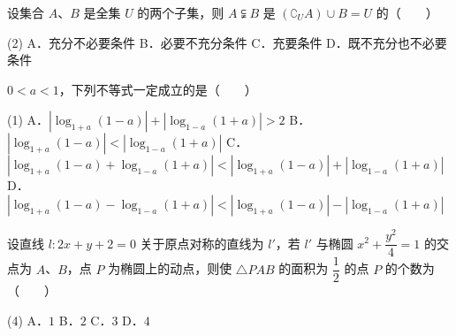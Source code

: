 \begin{question}
设集合 $A$、$B$ 是全集 $U$ 的两个子集，则 $A \subsetneqq B$ 是 $(\complement_U A) \cup B = U$ 的\mbox{（　　）}

\begin{gkopts}(2)
\task A．充分不必要条件
\task B．必要不充分条件
\task C．充要条件
\task D．既不充分也不必要条件
\end{gkopts}

\end{question}
\begin{question}
$0 < a < 1$，下列不等式一定成立的是\mbox{（　　）}

\begin{gkopts}(1)
\task A．$|\log_{1+a} (1-a)| + |\log_{1-a} (1+a)| > 2$
\task B．$|\log_{1+a} (1-a)| < |\log_{1-a} (1+a)|$
\task C．$|\log_{1+a} (1-a) + \log_{1-a} (1+a)| < |\log_{1+a} (1-a)| + |\log_{1-a} (1+a)|$
\task D．$|\log_{1+a} (1-a) - \log_{1-a} (1+a)| < |\log_{1+a} (1-a)| - |\log_{1-a} (1+a)|$
\end{gkopts}

\end{question}
\begin{question}
设直线 $l: 2x + y + 2 = 0$ 关于原点对称的直线为 $l'$，若 $l'$ 与椭圆 $x^2 + \dfrac{y^2}{4} = 1$ 的交点为 $A$、$B$，点 $P$ 为椭圆上的动点，则使 $\triangle PAB$ 的面积为 $\dfrac{1}{2}$ 的点 $P$ 的个数为\mbox{（　　）}

\begin{gkopts}(4)
\task A．$1$
\task B．$2$
\task C．$3$
\task D．$4$
\end{gkopts}

\end{question}

